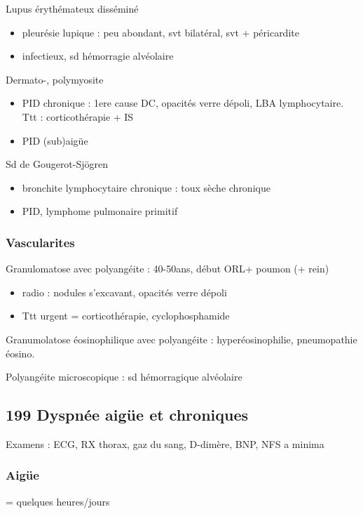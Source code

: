 \documentclass[11pt]{article}
\begin{document}
Lupus érythémateux disséminé 

\begin{itemize}
\item pleurésie lupique : peu abondant, svt bilatéral, svt + péricardite
\item infectieux, sd hémorragie alvéolaire
\end{itemize}

Dermato-, polymyosite

\begin{itemize}
\item PID chronique : 1ere cause DC, opacités verre dépoli, \gls{LBA} lymphocytaire.
Ttt : corticothérapie + IS
\item PID (sub)aigüe
\end{itemize}

Sd de Gougerot-Sjögren

\begin{itemize}
\item bronchite lymphocytaire chronique : toux sèche chronique
\item PID, lymphome pulmonaire primitif
\end{itemize}


\subsubsection{Vascularites}
\label{sec:org99e5e04}
Granulomatose avec polyangéite : 40-50ans, début ORL+ poumon (+ rein)

\begin{itemize}
\item radio : nodules s'excavant, opacités verre dépoli
\item Ttt urgent = corticothérapie, cyclophosphamide
\end{itemize}

Granumolatose éosinophilique avec polyangéite :  hyperéosinophilie, pneumopathie
éosino.

Polyangéite microscopique : sd hémorragique alvéolaire

\subsection{199 \textdagger{} Dyspnée aigüe et chroniques}
\label{sec:orgb130525}
\label{sec:199_dyspnee_aigue_et_chronique}
Examens : ECG, RX thorax, gaz du sang, D-dimère, BNP, NFS a minima

\subsubsection{Aigüe}
\label{sec:org317dfa4}
= quelques heures/jours
\end{document}
